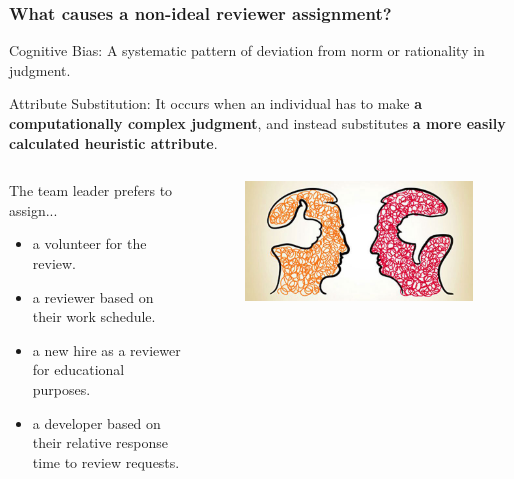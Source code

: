 \documentclass{beamer}
\begin{document}
%
\begin{frame}
\frametitle{\large What causes a non-ideal reviewer assignment?}
     \begin{block}{Cognitive Bias:}
        A systematic pattern of deviation from norm or rationality in judgment.
    \end{block}
    \pause
     \begin{block}{Attribute Substitution:}
        {It occurs when an individual has to make \textbf{a computationally complex judgment}, and instead substitutes \textbf{a more easily calculated heuristic attribute}.}
    \end{block}
    \pause
    \begin{columns}
    \begin{column}{0.6\textwidth}
    The team leader prefers to assign...
      \begin{itemize}
    \item  a volunteer for the review.
    \item   a reviewer based on their work schedule.
    \item a new hire as a reviewer for educational purposes.
    \item a developer based on their relative response time to review requests.
    \end{itemize}
    \end{column}
    \begin{column}{0.4\textwidth}  %
      \begin{figure}
      \includegraphics[scale=0.2]{img/cog_bias.jpg}
      \end{figure}
\end{column}
\end{columns}


\end{frame}
\end{document}
